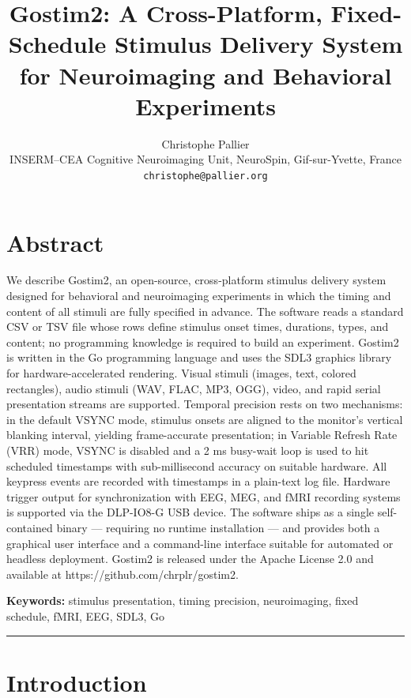 \documentclass[
  11pt,
]{article}
\title{Gostim2: A Cross-Platform, Fixed-Schedule Stimulus Delivery System\\
  for Neuroimaging and Behavioral Experiments}
\author{Christophe Pallier\\
  \small INSERM--CEA Cognitive Neuroimaging Unit, NeuroSpin, Gif-sur-Yvette, France\\
  \small \texttt{christophe@pallier.org}}
\date{}
\begin{document}
\maketitle

\section{Abstract}\label{abstract}

We describe Gostim2, an open-source, cross-platform stimulus delivery
system designed for behavioral and neuroimaging experiments in which the
timing and content of all stimuli are fully specified in advance. The
software reads a standard CSV or TSV file whose rows define stimulus
onset times, durations, types, and content; no programming knowledge is
required to build an experiment. Gostim2 is written in the Go
programming language and uses the SDL3 graphics library for
hardware-accelerated rendering. Visual stimuli (images, text, colored
rectangles), audio stimuli (WAV, FLAC, MP3, OGG), video, and rapid
serial presentation streams are supported. Temporal precision rests on
two mechanisms: in the default VSYNC mode, stimulus onsets are aligned
to the monitor's vertical blanking interval, yielding frame-accurate
presentation; in Variable Refresh Rate (VRR) mode, VSYNC is disabled and
a 2 ms busy-wait loop is used to hit scheduled timestamps with
sub-millisecond accuracy on suitable hardware. All keypress events are
recorded with timestamps in a plain-text log file. Hardware trigger
output for synchronization with EEG, MEG, and fMRI recording systems is
supported via the DLP-IO8-G USB device. The software ships as a single
self-contained binary --- requiring no runtime installation --- and
provides both a graphical user interface and a command-line interface
suitable for automated or headless deployment. Gostim2 is released under
the Apache License 2.0 and available at
https://github.com/chrplr/gostim2.

\textbf{Keywords:} stimulus presentation, timing precision,
neuroimaging, fixed schedule, fMRI, EEG, SDL3, Go

\begin{center}\rule{0.5\linewidth}{0.5pt}\end{center}

\section{Introduction}\label{introduction}
\end{document}
